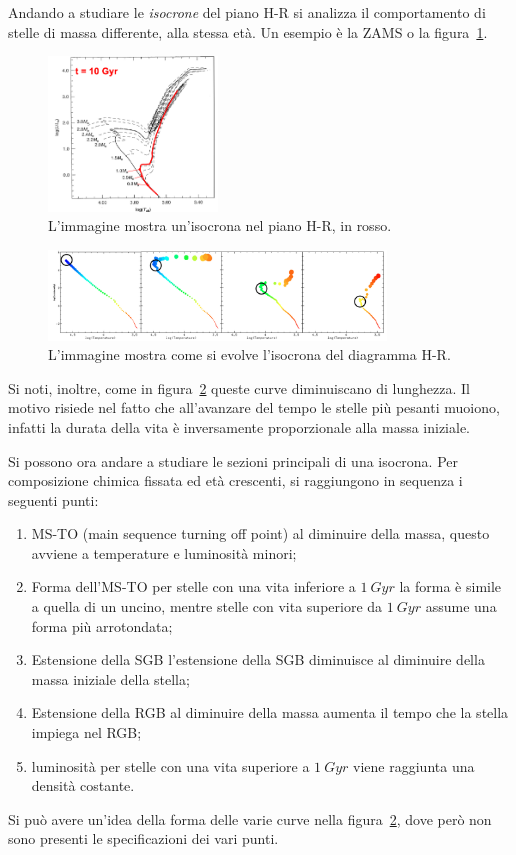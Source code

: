 Andando a studiare le \emph{isocrone} del piano H-R si analizza il comportamento di stelle di massa differente, alla stessa età. Un esempio è la ZAMS o la figura~\ref{fig:isocrona}.

\begin{figure}
    \centering
    \includegraphics[width = 0.4\textwidth]{immagini/HR-isocrona.png}
    \caption{L'immagine mostra un'isocrona nel piano H-R, in rosso.}\label{fig:isocrona}
\end{figure}
\begin{figure}
    \centering
    \includegraphics[width = 0.8\textwidth]{immagini/evoluzione-isocrona.png}
    \caption{L'immagine mostra come si evolve l'isocrona del diagramma H-R.}\label{fig:evoluzione-isocrona}
\end{figure}

Si noti, inoltre, come in figura~\ref{fig:evoluzione-isocrona} queste curve diminuiscano di lunghezza. Il motivo risiede nel fatto che all'avanzare del tempo le stelle più pesanti muoiono, infatti la durata della vita è inversamente proporzionale alla massa iniziale.

Si possono ora andare a studiare le sezioni principali di una isocrona. Per composizione chimica fissata ed età crescenti, si raggiungono in sequenza i seguenti punti:

\begin{enumerate}
    \item MS-TO (main sequence turning off point)\: al diminuire della massa, questo avviene a temperature e luminosità minori;
    \item Forma dell'MS-TO\: per stelle con una vita inferiore a $\SI{1}{Gyr}$ la forma è simile a quella di un uncino, mentre stelle con vita superiore da $\SI{1}{Gyr}$ assume una forma più arrotondata;
    \item Estensione della SGB\: l'estensione della SGB diminuisce al diminuire della massa iniziale della stella;
    \item Estensione della RGB\: al diminuire della massa aumenta il tempo che la stella impiega nel RGB;
    \item luminosità\: per stelle con una vita superiore a $\SI{1}{Gyr}$ viene raggiunta una densità costante.
\end{enumerate}
Si può avere un'idea della forma delle varie curve nella figura~\ref{fig:evoluzione-isocrona}, dove però non sono presenti le specificazioni dei vari punti.
